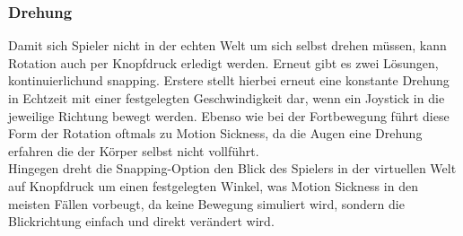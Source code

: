 \subsubsection{Drehung}
Damit sich Spieler nicht in der echten Welt um sich selbst drehen müssen, kann Rotation auch per Knopfdruck erledigt werden. Erneut gibt es zwei Lösungen, \dq kontinuierlich\dq und \dq snapping\dq . Erstere stellt hierbei erneut eine konstante Drehung in Echtzeit mit einer festgelegten Geschwindigkeit dar, wenn ein Joystick in die jeweilige Richtung bewegt werden. Ebenso wie bei der Fortbewegung führt diese Form der Rotation oftmals zu Motion Sickness, da die Augen eine Drehung erfahren die der Körper selbst nicht vollführt.\\
Hingegen dreht die Snapping-Option den Blick des Spielers in der virtuellen Welt auf Knopfdruck um einen festgelegten Winkel, was Motion Sickness in den meisten Fällen vorbeugt, da keine Bewegung simuliert wird, sondern die Blickrichtung einfach und direkt verändert wird.

